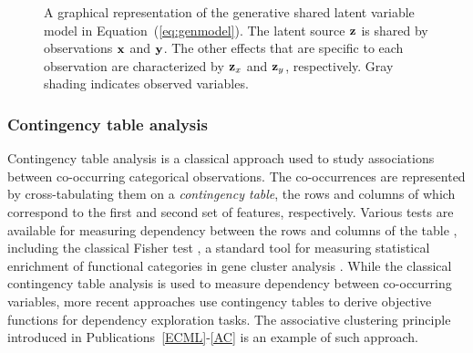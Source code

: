 \begin{figure}[ht!]
\caption{A graphical representation of the generative shared latent
  variable model in Equation~(\ref{eq:genmodel}). The latent source
  $\mathbf{z}$ is shared by observations $\mathbf{x}$ and $\mathbf{y}$. The other effects that
  are specific to each observation are characterized by $\mathbf{z}_x$ and
  $\mathbf{z}_y$, respectively. Gray shading indicates observed variables.}
\label{fig:modelpic}
\end{figure}


\subsubsection{Contingency table analysis}

Contingency table analysis is a classical approach used to study
associations between co-occurring categorical observations.  The
co-occurrences are represented by cross-tabulating them on a {\it
contingency table}, the rows and columns of which correspond to the
first and second set of features, respectively. Various tests are
available for measuring dependency between the rows and columns of the
table \citet{Yates34, Agresti92}, including the classical Fisher test
\citep{Fisher34}, a standard tool for measuring statistical enrichment
of functional categories in gene cluster analysis
\citep{Hosack03}. While the classical contingency table analysis is
used to measure dependency between co-occurring variables, more recent
approaches use contingency tables to derive objective functions for
dependency exploration tasks. The associative clustering principle
introduced in Publications~\ref{ECML}-\ref{AC} is an example of such
approach.

